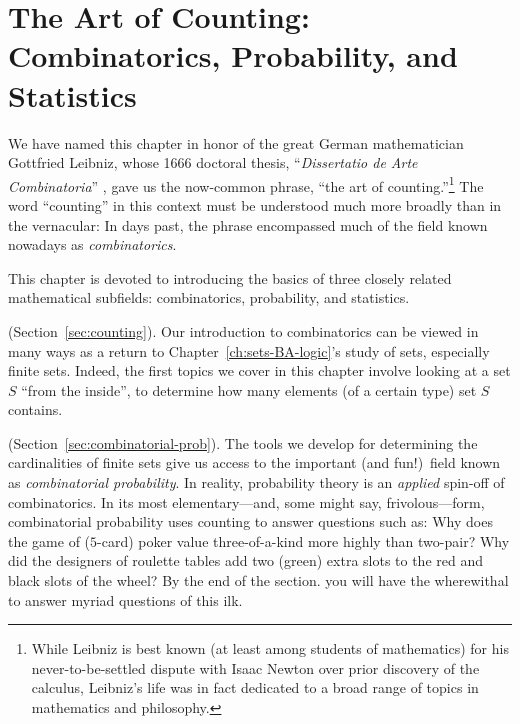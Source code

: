 
\chapter{The Art of Counting:
Combinatorics, Probability, and Statistics}
\label{ch:prob-stat}
\label{ch:combinatorics}

We have named this chapter in honor of the great German mathematician
Gottfried Leibniz,  whose
1666 doctoral thesis, ``{\it Dissertatio de Arte Combinatoria}''
\cite{Leibnitz}, gave us the now-common phrase, ``the art of
counting.''\footnote{While Leibniz is best known (at least among students of mathematics) for his
never-to-be-settled dispute with Isaac Newton 
over prior discovery of the calculus, Leibniz's life was in fact
dedicated to a broad range of topics in mathematics and philosophy.}
The word ``counting'' in this context must be understood
much more broadly than in the vernacular: In days past, the phrase
encompassed much of the field known nowadays as {\it
  combinatorics}. 

This chapter is devoted to introducing the basics of three closely related mathematical
subfields: combinatorics, probability, and statistics.

\medskip

 (Section~\ref{sec:counting}).
Our introduction to combinatorics can be viewed in many ways
as a return to Chapter~\ref{ch:sets-BA-logic}'s study of
sets, especially finite sets.  Indeed, the first topics we cover in
this chapter involve looking at a set $S$ ``from the inside'', to determine
how many elements (of a certain type) set $S$ contains.

\medskip

 (Section~\ref{sec:combinatorial-prob}).
The tools we develop for determining the cardinalities of finite sets
give us access to the important (and fun!)~field known as {\em
  combinatorial probability}. 
In reality, probability theory is an {\em applied} spin-off
of combinatorics.  In its most elementary---and, some might say, frivolous---form, combinatorial probability uses counting to 
answer questions such as:  Why does the game of
($5$-card) poker value three-of-a-kind more highly than two-pair?
Why did the designers of roulette tables add two (green) extra slots to
the red and black slots of the wheel?  By the end of the section. you will have the wherewithal to answer
myriad questions of this ilk.

